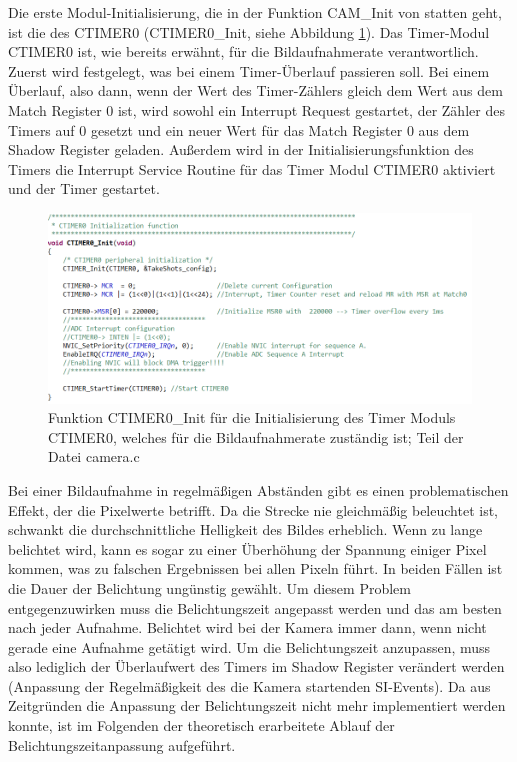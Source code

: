Die erste Modul-Initialisierung, die in der Funktion \glqq{}CAM\_Init\grqq{} von statten geht, ist die des CTIMER0 (\glqq{}CTIMER0\_Init\grqq{}, siehe Abbildung \ref{fig:CTIMER0Init}). Das Timer-Modul CTIMER0 ist, wie bereits erwähnt, für die Bildaufnahmerate verantwortlich. Zuerst wird festgelegt, was bei einem Timer-Überlauf passieren soll. Bei einem Überlauf, also dann, wenn der Wert des Timer-Zählers gleich dem Wert aus dem Match Register 0 ist, wird sowohl ein Interrupt Request gestartet, der Zähler des Timers auf 0 gesetzt und ein neuer Wert für das Match Register 0 aus dem Shadow Register geladen. Außerdem wird in der Initialisierungsfunktion des Timers die Interrupt Service Routine für das Timer Modul CTIMER0 aktiviert und der Timer gestartet.

\begin{figure}[H] %
\includegraphics[width=\textwidth]{sec7/images/code/CTIMER0Init} 
\centering
\captionsetup{width=.95\textwidth}
\caption[Funktion \glqq{}CTIMER0\_Init\grqq{} aus der Datei \glqq{}camera.c\grqq{}]{Funktion \glqq{}CTIMER0\_Init\grqq{} für die Initialisierung des Timer Moduls CTIMER0, welches für die Bildaufnahmerate zuständig ist; Teil der Datei \glqq{}camera.c\grqq{}}\centering
\label{fig:CTIMER0Init}
\end{figure}

Bei einer Bildaufnahme in regelmäßigen Abständen gibt es einen problematischen Effekt, der die Pixelwerte betrifft. Da die Strecke nie gleichmäßig beleuchtet ist, schwankt die durchschnittliche Helligkeit des Bildes erheblich. Wenn zu lange belichtet wird, kann es sogar zu einer Überhöhung der Spannung einiger Pixel kommen, was zu falschen Ergebnissen bei allen Pixeln führt. In beiden Fällen ist die Dauer der Belichtung ungünstig gewählt. Um diesem Problem entgegenzuwirken muss die Belichtungszeit angepasst werden und das am besten nach jeder Aufnahme. Belichtet wird bei der Kamera immer dann, wenn nicht gerade eine Aufnahme getätigt wird. Um die Belichtungszeit anzupassen, muss also lediglich der Überlaufwert des Timers im Shadow Register verändert werden (Anpassung der Regelmäßigkeit des die Kamera startenden SI-Events). Da aus Zeitgründen die Anpassung der Belichtungszeit nicht mehr implementiert werden konnte, ist im Folgenden der theoretisch erarbeitete Ablauf der Belichtungszeitanpassung aufgeführt.\vspace{18pt}

